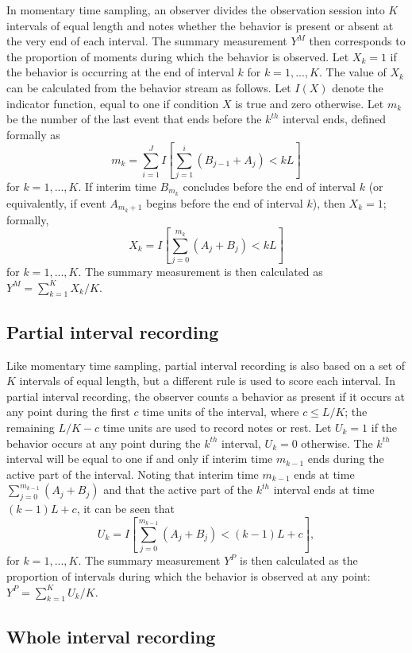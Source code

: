 \documentclass{article}\usepackage[]{graphicx}\usepackage[]{color}
\begin{document}
In momentary time sampling, an observer divides the observation session into $K$ intervals of equal length and notes whether the behavior is present or absent at the very end of each interval. The summary measurement $Y^M$ then corresponds to the proportion of moments during which the behavior is observed. Let $X_k = 1$ if the behavior is occurring at the end of interval $k$ for $k = 1,...,K$. The value of $X_k$ can be calculated from the behavior stream as follows. Let $I(X)$ denote the indicator function, equal to one if condition $X$ is true and zero otherwise. Let $m_k$ be the number of the last event that ends before the $k^{th}$ interval ends, defined formally as \[
m_k = \sum_{i=1}^J I\left[\sum_{j=1}^i \left(B_{j-1} + A_j\right) < k L \right] \]
for $k = 1,...,K$. If interim time $B_{m_k}$ concludes before the end of interval $k$ (or equivalently, if event $A_{m_k+1}$ begins before the end of interval $k$), then $X_k = 1$; formally,  \[
X_k = I\left[\sum_{j=0}^{m_k} \left(A_j + B_j\right) < k L \right] \]
for $k = 1,...,K$. The summary measurement is then calculated as $\displaystyle{Y^M = \sum_{k=1}^K X_k / K}$. 

\subsection{Partial interval recording}

Like momentary time sampling, partial interval recording is also based on a set of $K$ intervals of equal length, but a different rule is used to score each interval. In partial interval recording, the observer counts a behavior as present if it occurs at any point during the first $c$ time units of the interval, where $c \leq L / K$; the remaining $L / K - c$ time units are used to record notes or rest. Let $U_k = 1$ if the behavior occurs at any point during the $k^{th}$ interval, $U_k = 0$ otherwise. The $k^{th}$ interval will be equal to one if and only if interim time $m_{k-1}$ ends during the active part of the interval. Noting that interim time $m_{k-1}$ ends at time $\sum_{j=0}^{m_{k-1}} \left(A_j + B_j\right)$ and that the active part of the $k^{th}$ interval ends at time $(k-1)L + c$, it can be seen that\[
U_k = I \left[\sum_{j=0}^{m_{k-1}} \left(A_j + B_j\right) < (k-1)L + c \right], \]
for $k=1,...,K$. The summary measurement $Y^P$ is then calculated as the proportion of intervals during which the behavior is observed at any point: $\displaystyle{Y^P = \sum_{k=1}^K U_k / K}$.

\subsection{Whole interval recording}
\end{document}
